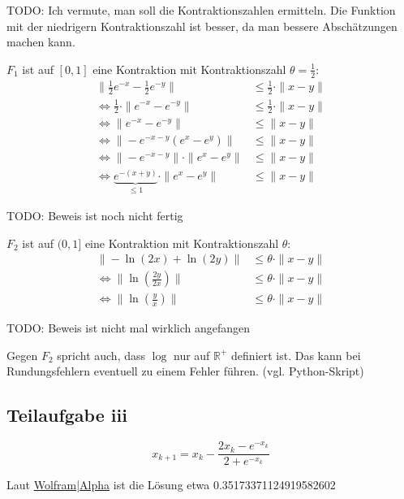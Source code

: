 TODO: Ich vermute, man soll die Kontraktionszahlen ermitteln.
Die Funktion mit der niedrigern Kontraktionszahl ist besser, da man
bessere Abschätzungen machen kann.

$F_1$ ist auf $[0,1]$ eine Kontraktion mit Kontraktionszahl $\theta = \frac{1}{2}$:
\begin{align}
    \|\frac{1}{2} e^{-x} - \frac{1}{2} e^{-y}\| &\leq \frac{1}{2} \cdot \|x-y\|\\
    \Leftrightarrow \frac{1}{2} \cdot \| e^{-x} - e^{-y}\| &\leq \frac{1}{2} \cdot \|x-y\|\\
    \Leftrightarrow \| e^{-x} - e^{-y}\| &\leq \|x-y\|\\
    \Leftrightarrow \| -e^{-x-y}(e^{x} - e^{y})\| &\leq \|x-y\|\\
    \Leftrightarrow \|-e^{-x-y} \| \cdot \|e^{x} - e^{y}\| &\leq \|x-y\|\\
    \Leftrightarrow \underbrace{e^{-(x+y)}}_{\leq 1} \cdot \|e^{x} - e^{y}\| &\leq \|x-y\|
\end{align}

TODO: Beweis ist noch nicht fertig

$F_2$ ist auf $(0,1]$ eine Kontraktion mit Kontraktionszahl $\theta$:
\begin{align}
    \|- \ln (2x) + \ln(2y) \| &\leq \theta \cdot \|x-y\|\\
    \Leftrightarrow \| \ln(\frac{2y}{2x}) \| &\leq \theta \cdot \|x-y\|\\
    \Leftrightarrow \| \ln(\frac{y}{x}) \| &\leq \theta \cdot \|x-y\|
\end{align}

TODO: Beweis ist nicht mal wirklich angefangen

Gegen $F_2$ spricht auch, dass $\log$ nur auf $\mathbb{R}^+$ definiert
ist. Das kann bei Rundungsfehlern eventuell zu einem Fehler führen.
(vgl. Python-Skript)

\subsection*{Teilaufgabe iii}
\[x_{k+1} = x_k - \frac{2x_k - e^{-x_k}}{2 + e^{-x_k}}\]

Laut \href{http://www.wolframalpha.com/input/?i=2x-e%5E(-x)%3D0}{Wolfram|Alpha} ist die Lösung etwa 0.35173371124919582602

